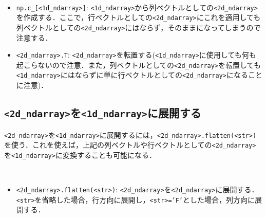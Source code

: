 \begin{gram}　
\begin{itemize}
\item \texttt{np.c\_[<1d\_ndarray>]}: \texttt{<1d\_ndarray>}から列ベクトルとしての\texttt{<2d\_ndarray>}を作成する．ここで，行ベクトルとしての\texttt{<2d\_ndarray>}にこれを適用しても列ベクトルとしての\texttt{<2d\_ndarray>}にはならず，そのままになってしまうので注意する．
\item \texttt{<2d\_ndarray>.T}: \texttt{<2d\_ndarray>}を転置する(\texttt{<1d\_ndarray>}に使用しても何も起こらないので注意．また，列ベクトルとしての\texttt{<2d\_ndarray>}を転置しても\texttt{<1d\_ndarray>}にはならずに単に行ベクトルとしての\texttt{<2d\_ndarray>}になることに注意)．
\end{itemize}
\end{gram}

\begin{cod}[\texttt{num3.py}]　
}]{code/num3.py}
\vspace{-7pt}
\begin{lstlisting}
array_1d=
[1 3 5 9]
shape=(4,)
type=<class 'numpy.ndarray'>

array_cv=
[[1]
 [3]
 [5]
 [9]]
shape=(4, 1)
type=<class 'numpy.ndarray'>

array_cv=
[[1 3 5 9]]
shape=(1, 4)
type=<class 'numpy.ndarray'>

array_1d_modc=
[[1]
 [3]
 [5]
 [9]]
shape=(4, 1)
type=<class 'numpy.ndarray'>

array_1d_modr=
[[1 3 5 9]]
shape=(1, 4)
type=<class 'numpy.ndarray'>

array_rv_modc=
[[1 3 5 9]]
shape=(1, 4)
type=<class 'numpy.ndarray'>
\end{lstlisting}
\end{cod}
\vspace{-10pt}

\subsection{\texttt{<2d\_ndarray>}を\texttt{<1d\_ndarray>}に展開する}
\texttt{<2d\_ndarray>}を\texttt{<1d\_ndarray>}に展開するには，\texttt{<2d\_ndarray>.flatten(<str>)}を使う．これを使えば，上記の列ベクトルや行ベクトルとしての\texttt{<2d\_ndarray>}を\texttt{<1d\_ndarray>}に変換することも可能になる．

\begin{gram}　
\begin{itemize}
\item \texttt{<2d\_ndarray>.flatten(<str>)}: \texttt{<2d\_ndarray>}を\texttt{<2d\_ndarray>}に展開する．\texttt{<str>}を省略した場合，行方向に展開し，\texttt{<str>='F'}とした場合，列方向に展開する．
\end{itemize}
\end{gram}

